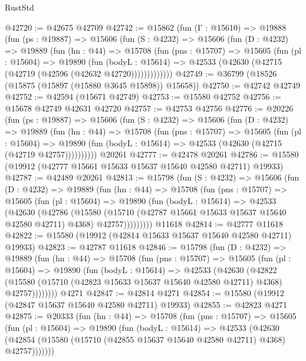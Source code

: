 \begin{lexlean}{RustStd}
\begin{coremodule}
@42720 := @42675 @42709
@42742 := @15862
    (fun (Γ : @15610) =>
    @19888
      (fun (ps : @19887) =>
      @15606
        (fun (S : @4232) =>
        @15606
          (fun (D : @4232) =>
          @19889
            (fun (hn : @44) =>
            @15708
              (fun (pns : @15707) =>
              @15605
                (fun (pl : @15604) =>
                @19890
                  (fun (bodyL : @15614) =>
                  @42533 (@42630 (@42715 (@42719 (@42596 (@42632 @42720)))))))))))))
@42749 := @36799 (@18526 (@15875 (@15897 (@15880 @3645 @15898)) @15658))
@42750 := @42742 @42749
@42752 := @42594 (@15671 @42749)
@42753 := @15580 @42752
@42756 := @15678 @42749 @42631 @42720
@42757 := @42753 @42756
@42776 := @20226
    (fun (ps : @19887) =>
    @15606
      (fun (S : @4232) =>
      @15606
        (fun (D : @4232) =>
        @19889
          (fun (hn : @44) =>
          @15708
            (fun (pns : @15707) =>
            @15605
              (fun (pl : @15604) =>
              @19890 (fun (bodyL : @15614) => @42533 (@42630 (@42715 (@42719 @42757))))))))))
    @20261
@42777 := @42478 @20261
@42786 := @15580 (@19912 (@42777 @15661 @15633 @15637 @15640 @42580 @42711) @19933)
@42787 := @42489 @20261
@42813 := @15798
    (fun (S : @4232) =>
    @15606
      (fun (D : @4232) =>
      @19889
        (fun (hn : @44) =>
        @15708
          (fun (pns : @15707) =>
          @15605
            (fun (pl : @15604) =>
            @19890
              (fun (bodyL : @15614) =>
              @42533
                (@42630
                  (@42786
                    (@15580
                      (@15710 (@42787 @15661 @15633 @15637 @15640 @42580 @42711) @4368)
                      @42757)))))))))
    @11618
@42814 := @42777 @11618
@42822 := @15580 (@19912 (@42814 @15633 @15637 @15640 @42580 @42711) @19933)
@42823 := @42787 @11618
@42846 := @15798
    (fun (D : @4232) =>
    @19889
      (fun (hn : @44) =>
      @15708
        (fun (pns : @15707) =>
        @15605
          (fun (pl : @15604) =>
          @19890
            (fun (bodyL : @15614) =>
            @42533
              (@42630
                (@42822
                  (@15580 (@15710 (@42823 @15633 @15637 @15640 @42580 @42711) @4368) @42757))))))))
    @4271
@42847 := @42814 @4271
@42854 := @15580 (@19912 (@42847 @15637 @15640 @42580 @42711) @19933)
@42855 := @42823 @4271
@42875 := @20333
    (fun (hn : @44) =>
    @15708
      (fun (pns : @15707) =>
      @15605
        (fun (pl : @15604) =>
        @19890
          (fun (bodyL : @15614) =>
          @42533
            (@42630
              (@42854 (@15580 (@15710 (@42855 @15637 @15640 @42580 @42711) @4368) @42757)))))))

\end{coremodule}
\end{lexlean}
